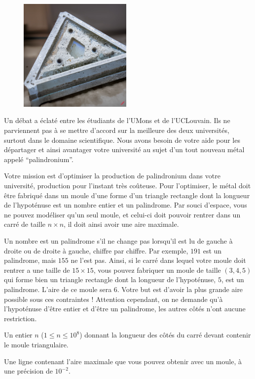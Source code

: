 \problemname{\problemyamlname}

\begin{figure}
    \centering
    \includegraphics[width=5.5cm]{palindromium.jpg}
\end{figure}
Un débat a éclaté entre les étudiants de l'UMons et de l'UCLouvain.
Ils ne parviennent pas à se mettre d'accord sur la meilleure des deux universités, surtout dans le domaine scientifique.
Nous avons besoin de votre aide pour les départager et ainsi avantager votre université au sujet d'un tout nouveau métal appelé ``palindronium''.

Votre mission est d'optimiser la production de palindronium dans votre université, production pour l'instant très coûteuse.
Pour l'optimiser, le métal doit être fabriqué dans un moule d'une forme d'un triangle rectangle dont la longueur de l'hypoténuse est un nombre entier et un palindrome.
Par souci d'espace, vous ne pouvez modéliser qu'un seul moule, et celui-ci doit pouvoir rentrer dans un carré de taille $n \times n$, il doit ainsi avoir une aire maximale.

Un nombre est un palindrome s'il ne change pas lorsqu'il est lu de gauche à droite ou de droite à gauche, chiffre par chiffre.
Par exemple, $191$ est un palindrome, mais $155$ ne l'est pas.
Ainsi, si le carré dans lequel votre moule doit rentrer a une taille de $15 \times 15$, vous pouvez fabriquer un moule de taille $(3,4,5)$ qui forme bien un triangle rectangle dont la longueur de l'hypoténuse, $5$, est un palindrome.
L'aire de ce moule sera $6$.
Votre but est d'avoir la plus grande aire possible sous ces contraintes ! Attention cependant, on ne demande qu'à l'hypoténuse d'être entier et d'être un palindrome, les autres côtés n'ont aucune restriction.

\begin{Input}
	Un entier $n$ ($1 \le n \le 10^8$) donnant la longueur des côtés du carré devant contenir le moule triangulaire.
\end{Input}

\begin{Output}
	Une ligne contenant l'aire maximale que vous pouvez obtenir avec un moule, à une précision de $10^{-2}$.
\end{Output}

